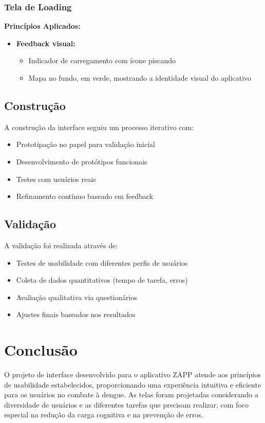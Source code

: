 \documentclass[a5paper, 12pt]{article}
\begin{document}
\subsubsection{Tela de Loading}
\textbf{Princípios Aplicados:}
\begin{itemize}[leftmargin=*]
    \item \textbf{Feedback visual:}
    \begin{itemize}
        \item Indicador de carregamento com ícone piscando
        \item Mapa no fundo, em verde, mostrando a identidade visual do aplicativo
    \end{itemize}
\end{itemize}

\subsection{Construção}
A construção da interface seguiu um processo iterativo com:
\begin{itemize}
\item Prototipação no papel para validação inicial
\item Desenvolvimento de protótipos funcionais
\item Testes com usuários reais
\item Refinamento contínuo baseado em feedback
\end{itemize}

\subsection{Validação}
A validação foi realizada através de:
\begin{itemize}
\item Testes de usabilidade com diferentes perfis de usuários
\item Coleta de dados quantitativos (tempo de tarefa, erros)
\item Avaliação qualitativa via questionários
\item Ajustes finais baseados nos resultados
\end{itemize}

\section{Conclusão}
O projeto de interface desenvolvido para o aplicativo ZAPP atende aos princípios de usabilidade estabelecidos, proporcionando uma experiência intuitiva e eficiente para os usuários no combate à dengue. As telas foram projetadas considerando a diversidade de usuários e as diferentes tarefas que precisam realizar, com foco especial na redução da carga cognitiva e na prevenção de erros.
\end{document}
